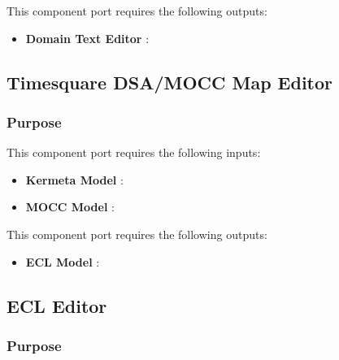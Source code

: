 \documentclass{gemoc} %
\begin{document}
This component port requires the following outputs:
\begin{itemize}
  \item \textbf{Domain Text Editor} :
\end{itemize}

\subsection{Timesquare DSA/MOCC Map Editor}


\subsubsection{Purpose}

This component port requires the following inputs:
\begin{itemize}
  \item \textbf{Kermeta Model} :
  \item \textbf{MOCC Model} :
\end{itemize}

This component port requires the following outputs:
\begin{itemize}
  \item \textbf{ECL Model} :
\end{itemize}

\subsection{ECL Editor}


\subsubsection{Purpose}

\end{document}
